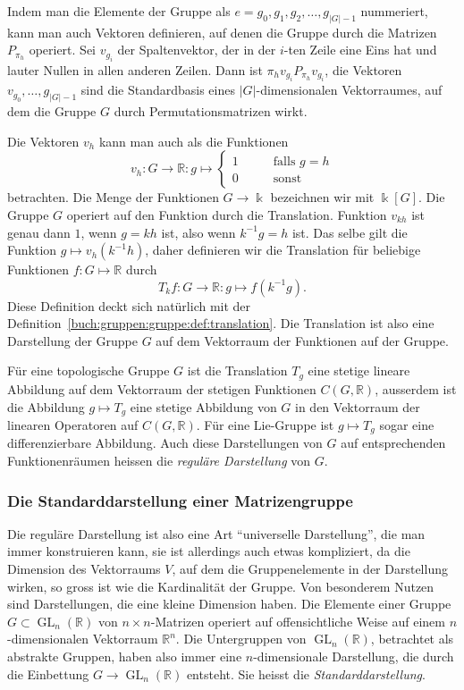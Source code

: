 Indem man die Elemente der Gruppe als $e=g_0,g_1,g_2,\dots,g_{|G|-1}$
nummeriert, kann man auch Vektoren definieren, auf denen die
Gruppe durch die Matrizen $P_{\pi_h}$ operiert.
Sei $v_{g_i}$ der Spaltenvektor, der in der $i$-ten Zeile eine Eins
hat und lauter Nullen in allen anderen Zeilen.
Dann ist $\pi_{h}v_{g_i} P_{\pi_h}v_{g_i}$, die Vektoren
$v_{g_0},\dots,g_{|G|-1}$ sind die Standardbasis eines $|G|$-dimensionalen
Vektorraumes, auf dem die Gruppe $G$ durch Permutationsmatrizen wirkt.

Die Vektoren $v_h$ kann man auch als die Funktionen
\[
v_h
\colon
G\to\mathbb{R}
:
g\mapsto
\begin{cases}
1&\qquad\text{falls $g=h$}\\
0&\qquad\text{sonst}
\end{cases}
\]
betrachten.
Die Menge der Funktionen $G\to\Bbbk$ bezeichnen wir mit $\Bbbk[G]$.
Die Gruppe $G$ operiert auf den Funktion durch die Translation.
Funktion $v_{kh}$ ist genau dann $1$, wenn $g=kh$ ist, also wenn $k^{-1}g=h$
ist.
Das selbe gilt die Funktion $g\mapsto v_h(k^{-1}h)$, daher definieren wir
die Translation für beliebige Funktionen $f\colon G\mapsto \mathbb{R}$
durch
\[
T_kf\colon G\to\mathbb{R}:g\mapsto f(k^{-1}g).
\]
Diese Definition deckt sich natürlich mit der
Definition~\ref{buch:gruppen:gruppe:def:translation}.
Die Translation ist also eine Darstellung der Gruppe $G$ auf dem
Vektorraum der Funktionen auf der Gruppe.

Für eine topologische Gruppe $G$ ist die Translation $T_g$ eine 
stetige lineare Abbildung auf dem Vektorraum der stetigen Funktionen
$C(G,\mathbb{R})$, ausserdem ist die Abbildung $g\mapsto T_g$ eine
stetige Abbildung von $G$ in den Vektorraum der linearen Operatoren
auf $C(G,\mathbb{R})$.
Für eine Lie-Gruppe ist $g\mapsto T_g$ sogar eine differenzierbare
Abbildung.
Auch diese Darstellungen von $G$ auf entsprechenden Funktionenräumen
heissen die {\em reguläre Darstellung} von $G$.

%
%
\subsubsection{Die Standarddarstellung einer Matrizengruppe}
Die reguläre Darstellung ist also eine Art ``universelle Darstellung'',
die man immer konstruieren kann, sie ist allerdings auch etwas kompliziert,
da die Dimension des Vektorraums $V$, auf dem die Gruppenelemente in der
Darstellung wirken, so gross ist wie die Kardinalität der Gruppe.
Von besonderem Nutzen sind Darstellungen, die eine kleine Dimension haben.
Die Elemente einer Gruppe $G\subset\operatorname{GL}_n(\mathbb{R})$
von $n\times n$-Matrizen operiert auf offensichtliche Weise auf einem
$n$-dimensionalen Vektorraum $\mathbb{R}^n$.
Die Untergruppen von $\operatorname{GL}_n(\mathbb{R})$, betrachtet
als abstrakte Gruppen, haben also immer eine $n$-dimensionale Darstellung,
die durch die Einbettung $G\to \operatorname{GL}_n(\mathbb{R})$ entsteht.
Sie heisst die {\em Standarddarstellung}.

